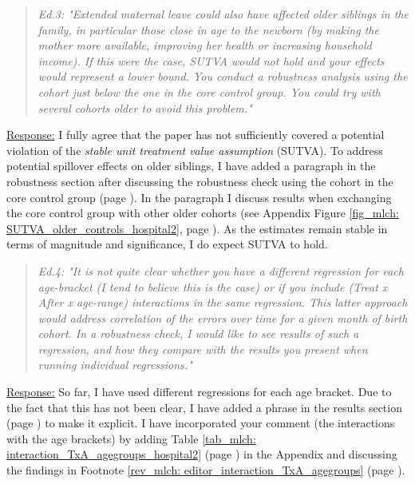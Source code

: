 \bigskip
{}
\begin{quote}
	\textit{Ed.3: "Extended maternal leave could also have affected older siblings in the family, in particular those close in age to the newborn (by making the mother more available, improving her health or increasing household income). If this were the case, SUTVA would not hold and your effects would represent a lower bound. You conduct a robustness analysis using the cohort just below the one in the core control group. You could try with several cohorts older to avoid this problem."}
\end{quote}
\underline{Response:}
I fully agree that the paper has not sufficiently covered a potential violation of the \textit{stable unit treatment value assumption} (SUTVA). To address potential spillover effects on older siblings, I have added a paragraph in the robustness section after discussing the robustness check using the cohort in the core control group (page \pageref{rev_mlch: editor_SUTVA_older_cohorts}). In the paragraph I discuss results when exchanging the core control group with other older cohorts (see Appendix Figure \ref{fig_mlch: SUTVA_older_controls_hospital2}, page \pageref{fig_mlch: SUTVA_older_controls_hospital2}). As the estimates remain stable in terms of magnitude and significance, I do expect SUTVA to hold.



\bigskip
{}
\begin{quote}
	\textit{Ed.4: "It is not quite clear whether you have a different regression for each age-bracket (I tend to believe this is the case) or if you include (Treat x After x age-range) interactions in the same regression. This latter approach would address correlation of the errors over time for a given month of birth cohort. In a robustness check, I would like to see results of such a regression, and how they compare with the results you present when running individual regressions."}
\end{quote}
\underline{Response:}
So far, I have used different regressions for each age bracket. Due to the fact that this has not been clear, I have added a phrase in the results section (page \pageref{rev_mlch: editor_comprehension_interaction}) to make it explicit. I have incorporated your comment (the interactions with the age brackets) by adding Table \ref{tab_mlch: interaction_TxA_agegroups_hospital2} (page \pageref{tab_mlch: interaction_TxA_agegroups_hospital2}) in the Appendix and discussing the findings in Footnote \ref{rev_mlch: editor_interaction_TxA_agegroups} (page \pageref{rev_mlch: editor_interaction_TxA_agegroups}).

